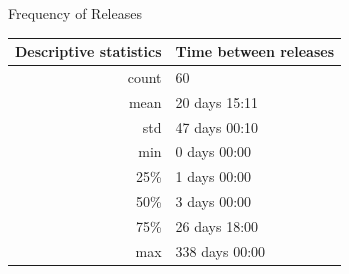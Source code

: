 \changepapersize{305.3mm:210mm}

{
	\LARGE
	\noindent Frequency of Releases\par
	\vspace{0.2cm}
}

\begin{multicols}{3}
	\noindent
	\begin{minipage}{\columnwidth + \columnsep}
		\begin{tabular}{|r|l|}
			\hline
			Descriptive statistics & Time between releases \\
			\hline
			count                  & 60                    \\
			mean                   & 20 days 15:11         \\
			std                    & 47 days 00:10         \\
			min                    & 0 days 00:00          \\
			25\%                   & 1 days 00:00          \\
			50\%                   & 3 days 00:00          \\
			75\%                   & 26 days 18:00         \\
			max                    & 338 days 00:00        \\
			\hline
		\end{tabular}
		\label{tab:release-statistics}
	\end{minipage}
	\columnbreak
	\noindent
	\begin{minipage}{\columnwidth}
		\label{fig:releases-histogram}
	\end{minipage}
\end{multicols}

